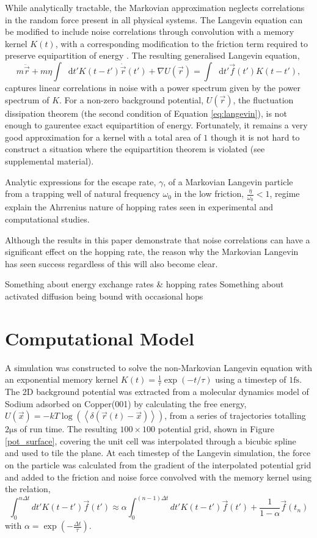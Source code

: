 \documentclass[7pt]{article}
\newcommand*{\diff}{\mathop{}\!\mathrm{d}}
\newcommand{\fs}{\si{\femto\second}}
\newcommand{\us}{\si{\micro\second}}
\begin{document}
While analytically tractable, the Markovian approximation neglects correlations in the random force present in all physical systems. The Langevin equation can be modified to include noise correlations through convolution with a memory kernel $K(t)$, with a corresponding modification to the friction term required to preserve equipartition of energy \cite{Kubo}. The resulting generalised Langevin equation, 
\begin{equation}
	m\ddot{\vec{r}}+m\eta\int\diff{t'}K(t-t')\dot{\vec{r}}(t')+\nabla U(\vec{r})=\int\diff{t'}\vec{f}(t')K(t-t'),
	\label{eq:gle}
\end{equation}
captures linear correlations in noise with a power spectrum given by the power spectrum of $K$. For a non-zero background potential, $U(\vec{r})$, the fluctuation dissipation theorem (the second condition of Equation \ref{eq:langevin}), is not enough to gaurentee exact equipartition of energy. Fortunately, it remains a very good approximation for a kernel with a total area of $1$ though it is not hard to construct a situation where the equipartition theorem is violated (see supplemental material). 


Analytic expressions for the escape rate, $\gamma$, of a Markovian Langevin particle from a trapping well of natural frequency $\omega_0$ in the low friction, $\frac{\eta}{\omega_0} < 1$, regime explain the Ahrrenius nature of hopping rates seen in experimental and computational studies. 

Although the results in this paper demonstrate that noise correlations can have a significant effect on the hopping rate, the reason why the Markovian Langevin has seen success regardless of this will also become clear.

Something about energy exchange rates \& hopping rates
Something about activated diffusion being bound with occasional hops


\section{Computational Model}

A simulation was constructed to solve the non-Markovian Langevin equation with an exponential memory kernel $K(t)=\frac{1}{\tau}\exp(-t/\tau)$ using a timestep of $1\fs$. The 2D background potential was extracted from a molecular dynamics model of Sodium adsorbed on Copper(001) by calculating the free energy, $U(\vec{x}) = - kT \log(\left< \delta(\vec{r}(t)-\vec{x}) \right>)$, from a series of trajectories totalling $2 \us$ of run time. The resulting $100\times100$ potential grid, shown in Figure \ref{pot_surface},  covering the unit cell was interpolated through a bicubic spline\cite{press1992numerical} and used to tile the plane. At each timestep of the Langevin simulation, the force on the particle was calculated from the gradient of the interpolated potential grid and added to the friction and noise force convolved with the memory kernel using the relation,
$$
\int_0^{n\Delta{t}} dt' K\left(t-t'\right) \vec{f}(t') \approx \alpha \int_0^{(n-1)\Delta{t}} dt' K\left(t-t'\right) \vec{f}(t') + \frac{1}{1-\alpha} \vec{f}\left(t_n\right)
$$
with $\alpha=\exp(-\frac{\Delta{t}}{\tau})$.



\end{document}

